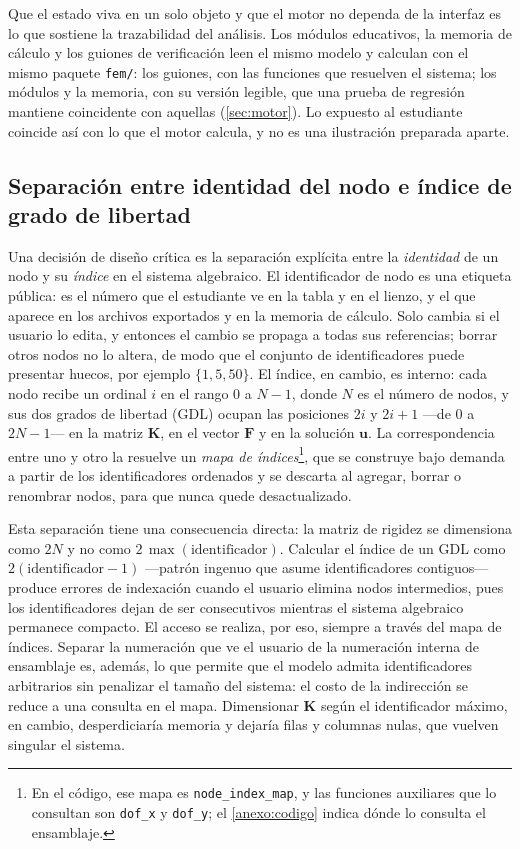 Que el estado viva en un solo objeto y que el motor no dependa de la interfaz es lo que sostiene la trazabilidad del análisis. Los módulos educativos, la memoria de cálculo y los guiones de verificación leen el mismo modelo y calculan con el mismo paquete \texttt{fem/}: los guiones, con las funciones que resuelven el sistema; los módulos y la memoria, con su versión legible, que una prueba de regresión mantiene coincidente con aquellas (\autoref{sec:motor}). Lo expuesto al estudiante coincide así con lo que el motor calcula, y no es una ilustración preparada aparte.

\subsection{Separación entre identidad del nodo e índice de grado de libertad}
\label{sec:identidad-gdl}

Una decisión de diseño crítica es la separación explícita entre la \emph{identidad} de un nodo y su \emph{índice} en el sistema algebraico. El identificador de nodo es una etiqueta pública: es el número que el estudiante ve en la tabla y en el lienzo, y el que aparece en los archivos exportados y en la memoria de cálculo. Solo cambia si el usuario lo edita, y entonces el cambio se propaga a todas sus referencias; borrar otros nodos no lo altera, de modo que el conjunto de identificadores puede presentar huecos, por ejemplo $\{1, 5, 50\}$. El índice, en cambio, es interno: cada nodo recibe un ordinal $i$ en el rango $0$ a $N-1$, donde $N$ es el número de nodos, y sus dos grados de libertad (GDL) ocupan las posiciones $2i$ y $2i+1$ —de $0$ a $2N-1$— en la matriz $\bm{K}$, en el vector $\bm{F}$ y en la solución $\bm{u}$. La correspondencia entre uno y otro la resuelve un \emph{mapa de índices}\footnote{En el código, ese mapa es \texttt{node\_index\_map}, y las funciones auxiliares que lo consultan son \texttt{dof\_x} y \texttt{dof\_y}; el \autoref{anexo:codigo} indica dónde lo consulta el ensamblaje.}, que se construye bajo demanda a partir de los identificadores ordenados y se descarta al agregar, borrar o renombrar nodos, para que nunca quede desactualizado.

Esta separación tiene una consecuencia directa: la matriz de rigidez se dimensiona como $2N$ y no como $2\,\max(\text{identificador})$. Calcular el índice de un GDL como $2(\text{identificador}-1)$ —patrón ingenuo que asume identificadores contiguos— produce errores de indexación cuando el usuario elimina nodos intermedios, pues los identificadores dejan de ser consecutivos mientras el sistema algebraico permanece compacto. El acceso se realiza, por eso, siempre a través del mapa de índices. Separar la numeración que ve el usuario de la numeración interna de ensamblaje es, además, lo que permite que el modelo admita identificadores arbitrarios sin penalizar el tamaño del sistema: el costo de la indirección se reduce a una consulta en el mapa. Dimensionar $\bm{K}$ según el identificador máximo, en cambio, desperdiciaría memoria y dejaría filas y columnas nulas, que vuelven singular el sistema.

